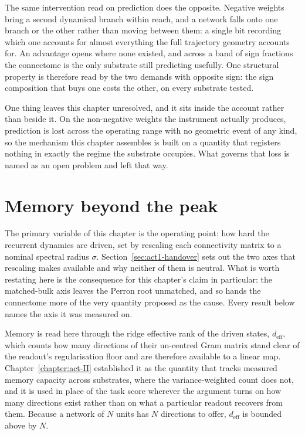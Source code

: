 The same intervention read on prediction does the opposite. Negative weights
bring a second dynamical branch within reach, and a network falls onto one branch
or the other rather than moving between them: a single bit recording which one
accounts for almost everything the full trajectory geometry accounts for. An
advantage opens where none existed, and across a band of sign fractions the
connectome is the only substrate still predicting usefully. One structural
property is therefore read by the two demands with opposite sign: the sign
composition that buys one costs the other, on every substrate tested.

One thing leaves this chapter unresolved, and it sits inside the account rather
than beside it. On the non-negative weights the instrument actually produces,
prediction is lost across the operating range with no geometric event of any
kind, so the mechanism this chapter assembles is built on a quantity that
registers nothing in exactly the regime the substrate occupies. What governs
that loss is named as an open problem and left that way.



\section{Memory beyond the peak}
\label{sec:act3-memory-sigma}
\bigskip

The primary variable of this chapter is the operating point: how hard the
recurrent dynamics are driven, set by rescaling each connectivity matrix to a
nominal spectral radius $\sigma$. Section~\ref{sec:act1-handover} sets out the
two axes that rescaling makes available and why neither of them is neutral. What
is worth restating here is the consequence for this chapter's claim in
particular: the matched-bulk axis leaves the Perron root unmatched, and so hands
the connectome more of the very quantity proposed as the cause. Every result
below names the axis it was measured on.

Memory is read here through the ridge effective rank of the driven states,
$d_{\mathrm{eff}}$, which counts how many directions of their un-centred Gram
matrix stand clear of the readout's regularisation floor and are therefore
available to a linear map. Chapter~\ref{chapter:act-II} established it as the
quantity that tracks measured memory capacity across substrates, where the
variance-weighted count does not, and it is used in place of the task score
wherever the argument turns on how many directions exist rather than on what a
particular readout recovers from them. Because a network of $N$ units has $N$ directions to offer,
$d_{\mathrm{eff}}$ is bounded above by $N$.


